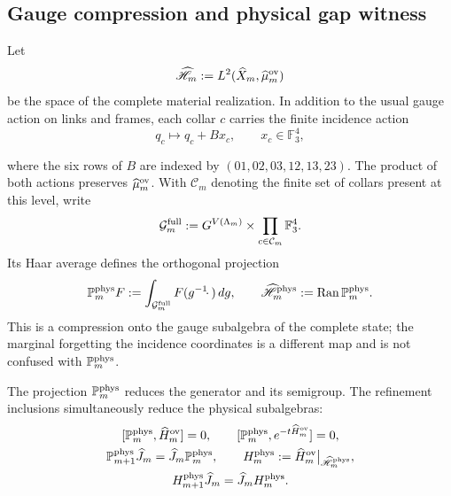 \subsection*{Gauge compression and physical gap witness}

Let
\[
 \widehat{\mathscr H}_m
 :=L^2(\widehat X_m,\widehat\mu_m^{\rm ov})
\]
be the space of the complete material realization. In addition to the usual gauge
action on links and frames, each collar \(c\) carries the finite incidence
action
\begin{equation}\label{eq:amp-ym-accion-gauge-incidencia}
 q_c\longmapsto q_c+Bx_c,
 \qquad x_c\in\mathbb F_3^4,
\end{equation}

where the six rows of \(B\) are indexed by
\((01,02,03,12,13,23)\). The product of both actions preserves
\(\widehat\mu_m^{\rm ov}\). With \(\mathcal C_m\) denoting the finite set of
collars present at this level, write
\[
 \mathcal G_m^{\rm full}
 :=G^{V(\Lambda_m)}
   \times\prod_{c\in\mathcal C_m}\mathbb F_3^4.
\]
Its Haar average defines the orthogonal
projection
\begin{equation}\label{eq:amp-ym-proyeccion-fisica-haar}
 \mathbb P_m^{\rm phys}F
 :=\int_{\mathcal G_m^{\rm full}}F(g^{-1}\!\cdot\,)\,dg,
 \qquad
 \widehat{\mathscr H}_m^{\rm phys}
 :=\operatorname{Ran}\mathbb P_m^{\rm phys}.
\end{equation}
This is a compression onto the gauge subalgebra of the complete state; the
marginal forgetting the incidence coordinates is a different map and is not
confused with \(\mathbb P_m^{\rm phys}\).

\begin{lemma}
\label{lem:amp-ym-compresion-fisica}
The projection \(\mathbb P_m^{\rm phys}\) reduces the generator and its
semigroup. The refinement inclusions simultaneously reduce the
physical subalgebras:
\begin{equation}\label{eq:amp-ym-compresion-entrelazada}
 \begin{gathered}
 \relax
 [\mathbb P_m^{\rm phys},\widehat H_m^{\rm ov}]=0,
 \qquad
 [\mathbb P_m^{\rm phys},e^{-t\widehat H_m^{\rm ov}}]=0,\\
 \mathbb P_{m+1}^{\rm phys}\widehat J_m
 =\widehat J_m\mathbb P_m^{\rm phys},\qquad
 H_m^{\rm phys}
 :=\widehat H_m^{\rm ov}\big|_{\widehat{\mathscr H}_m^{\rm phys}},\\
 H_{m+1}^{\rm phys}\widehat J_m
 =\widehat J_mH_m^{\rm phys}.
 \end{gathered}
\end{equation}
\end{lemma}

